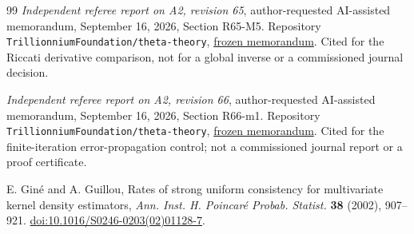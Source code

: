 \begin{thebibliography}{99}
\emph{Independent referee report on A2, revision 65},
author-requested AI-assisted memorandum, September 16, 2026,
Section R65-M5. Repository
\texttt{Trillionnium\allowbreak Foundation/\allowbreak theta-theory},
\href{https://github.com/TrillionniumFoundation/theta-theory/blob/7f4603531f7b97a23ce627fec47b7ddc5f4f9912/reviews/a2-v65-independent-harsh-top4-2026-09-16/REFEREE_REPORT.md}{frozen memorandum}.
Cited for the Riccati derivative comparison, not for a global inverse
or a commissioned journal decision.


\emph{Independent referee report on A2, revision 66},
author-requested AI-assisted memorandum, September 16, 2026,
Section R66-m1. Repository
\texttt{Trillionnium\allowbreak Foundation/\allowbreak theta-theory},
\href{https://github.com/TrillionniumFoundation/theta-theory/blob/3d49684cc6c9bad36d80c99dc46af276f53fae18/reviews/a2-v66-independent-harsh-top4-2026-09-16/REFEREE_REPORT.md}{frozen memorandum}.
Cited for the finite-iteration error-propagation control; not a
commissioned journal report or a proof certificate.


E. Gin\'e and A. Guillou,
Rates of strong uniform consistency for multivariate kernel density
estimators, \emph{Ann. Inst. H. Poincar\'e Probab. Statist.}
\textbf{38} (2002), 907--921.
\href{https://doi.org/10.1016/S0246-0203(02)01128-7}{doi:10.1016/S0246-0203(02)01128-7}.



\end{thebibliography}
